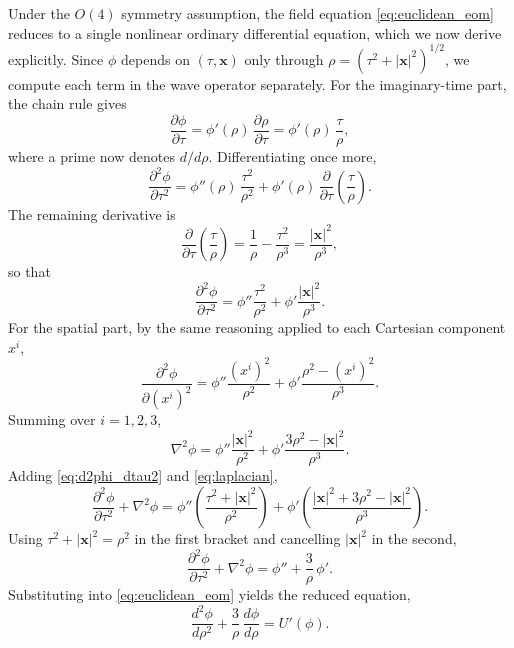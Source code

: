 Under the $O(4)$ symmetry assumption, the field equation
\eqref{eq:euclidean_eom} reduces to a single nonlinear ordinary
differential equation, which we now derive explicitly. Since $\phi$
depends on $(\tau,\mathbf{x})$ only through
$\rho=(\tau^{2}+|\mathbf{x}|^{2})^{1/2}$, we compute each term in the
wave operator separately. For the imaginary-time part, the chain rule
gives
\begin{equation}
    \frac{\partial\phi}{\partial\tau}
    =\phi'(\rho)\,\frac{\partial\rho}{\partial\tau}
    =\phi'(\rho)\,\frac{\tau}{\rho},
\end{equation}
where a prime now denotes $d/d\rho$. Differentiating once more,
\begin{equation}
    \frac{\partial^{2}\phi}{\partial\tau^{2}}
    =\phi''(\rho)\,\frac{\tau^{2}}{\rho^{2}}
    +\phi'(\rho)\,\frac{\partial}{\partial\tau}
    \!\left(\frac{\tau}{\rho}\right).
\end{equation}
The remaining derivative is
\begin{equation}
    \frac{\partial}{\partial\tau}\!\left(\frac{\tau}{\rho}\right)
    =\frac{1}{\rho}-\frac{\tau^{2}}{\rho^{3}}
    =\frac{|\mathbf{x}|^{2}}{\rho^{3}},
\end{equation}
so that
\begin{equation}
    \frac{\partial^{2}\phi}{\partial\tau^{2}}
    =\phi''\frac{\tau^{2}}{\rho^{2}}
    +\phi'\frac{|\mathbf{x}|^{2}}{\rho^{3}}.
    \label{eq:d2phi_dtau2}
\end{equation}
For the spatial part, by the same reasoning applied to each Cartesian
component $x^{i}$,
\begin{equation}
    \frac{\partial^{2}\phi}{\partial(x^{i})^{2}}
    =\phi''\frac{(x^{i})^{2}}{\rho^{2}}
    +\phi'\frac{\rho^{2}-(x^{i})^{2}}{\rho^{3}}.
\end{equation}
Summing over $i=1,2,3$,
\begin{equation}
    \nabla^{2}\phi
    =\phi''\frac{|\mathbf{x}|^{2}}{\rho^{2}}
    +\phi'\frac{3\rho^{2}-|\mathbf{x}|^{2}}{\rho^{3}}.
    \label{eq:laplacian}
\end{equation}
Adding \eqref{eq:d2phi_dtau2} and \eqref{eq:laplacian},
\begin{equation}
    \frac{\partial^{2}\phi}{\partial\tau^{2}}+\nabla^{2}\phi
    =\phi''\!\left(\frac{\tau^{2}+|\mathbf{x}|^{2}}{\rho^{2}}\right)
    +\phi'\!\left(\frac{|\mathbf{x}|^{2}+3\rho^{2}-|\mathbf{x}|^{2}}
    {\rho^{3}}\right).
\end{equation}
Using $\tau^{2}+|\mathbf{x}|^{2}=\rho^{2}$ in the first bracket and
cancelling $|\mathbf{x}|^{2}$ in the second,
\begin{equation}
    \frac{\partial^{2}\phi}{\partial\tau^{2}}+\nabla^{2}\phi
    =\phi''+\frac{3}{\rho}\,\phi'.
\end{equation}
Substituting into \eqref{eq:euclidean_eom} yields the reduced equation,
\begin{equation}
    \frac{d^{2}\phi}{d\rho^{2}}+\frac{3}{\rho}\,\frac{d\phi}{d\rho}
    =U'(\phi).
    \label{eq:reduced_ode}
\end{equation}

